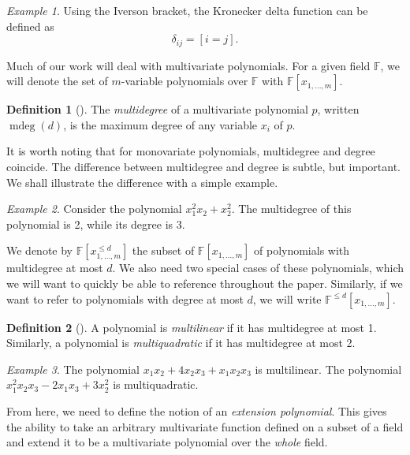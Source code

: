 \documentclass[english,12pt]{reedthesis}
\theoremstyle{plain}
\theoremstyle{definition}
\newtheorem{defn}[defn]{Definition}
\theoremstyle{remark}
\newtheorem{example}{Example}[thm]
\DeclareMathOperator{\mdeg}{mdeg}
\begin{document}
\begin{example}
  Using the Iverson bracket, the Kronecker delta function can be defined as
  \[
    \delta_{ij} = [i = j].
  \]
\end{example}

Much of our work will deal with multivariate polynomials. For a given field
$\mathbb{F}$, we will denote the set of $m$-variable polynomials over
$\mathbb{F}$ with $\mathbb{F}[x_{1, \ldots, m}]$.

\begin{defn}[{\cite[8]{AW09}}]\label{def:mdeg}
  The \emph{multidegree} of a multivariate polynomial $p$, written $\mdeg(d)$,
  is the maximum degree of any variable $x_{i}$ of $p$.
\end{defn}

It is worth noting that for monovariate polynomials, multidegree and degree
coincide. The difference between multidegree and degree is subtle, but
important. We shall illustrate the difference with a simple example.

\begin{example}
  Consider the polynomial $x_{1}^{2}x_{2} + x_{2}^{2}$. The multidegree of this
  polynomial is 2, while its degree is 3.
\end{example}

We denote by $\mathbb{F}[x_{1, \ldots, m}^{\le d}]$ the subset of
$\mathbb{F}[x_{1, \ldots, m}]$ of polynomials with multidegree at most $d$. We also
need two special cases of these polynomials, which we will want to quickly be
able to reference throughout the paper. Similarly, if we want to refer to
polynomials with degree at most $d$, we will write $\mathbb{F}^{\le d}[x_{1, \ldots, m}]$.

\begin{defn}[{\cite[8]{AW09}}]\label{def:mlin}
  A polynomial is \emph{multilinear} if it has multidegree at most 1. Similarly,
  a polynomial is \emph{multiquadratic} if it has multidegree at most 2.
\end{defn}

\begin{example}
  The polynomial $x_{1}x_{2} + 4x_{2}x_{3} + x_{1}x_{2}x_{3}$ is multilinear. The
  polynomial $x_{1}^{2}x_{2}x_{3} - 2x_{1}x_{3} + 3x_{2}^{2}$ is multiquadratic.
\end{example}

From here, we need to define the notion of an \emph{extension polynomial}. This
gives the ability to take an arbitrary multivariate function defined on a subset
of a field and extend it to be a multivariate polynomial over the \emph{whole}
field.
\end{document}
